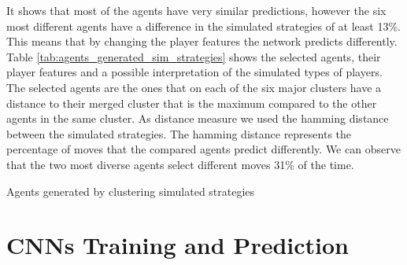 \noindent
It shows that most of the agents have very similar predictions, however the six most different agents have a difference in the simulated strategies of at least 13\%. This means that by changing the player features the network predicts differently. 
Table \ref{tab:agents_generated_sim_strategies} shows the selected agents, their player features and a possible interpretation of the simulated types of players. The selected agents are the ones that on each of the six major clusters have a distance to their merged cluster that is the maximum compared to the other agents in the same cluster. As distance measure we used the hamming distance between the simulated strategies. The hamming distance represents the percentage of moves that the compared agents predict differently. We can observe that the two most diverse agents select different moves 31\% of the time.
\begin{table}[h]
    \centering
    \small
    \caption{Agents generated by clustering simulated strategies} 
    
    \label{tab:agents_generated_sim_strategies}
\end{table} 


\section{CNNs Training and Prediction}

